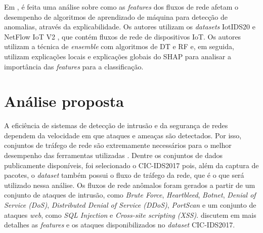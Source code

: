 \documentclass[12pt]{article}
\begin{document}
Em \cite{le2022classification}, é feita uma análise sobre como as \emph{features} dos fluxos de rede afetam o desempenho de algoritmos de aprendizado de máquina para detecção de anomalias, através da explicabilidade. Os autores utilizam os \emph{datasets} IotIDS20 \cite{ullah2020scheme} e NetFlow IoT V2 \cite{sarhan2022towards}, que contém fluxos de rede de dispositivos IoT. Os autores utilizam a técnica de \emph{ensemble} com algoritmos de DT e RF e, em seguida, utilizam explicações locais e explicações globais do SHAP para analisar a importância das \emph{features} para a classificação.


\section{Análise proposta}
\label{cap:analise}

A eficiência de sistemas de detecção de intrusão e da segurança de redes dependem da velocidade em que ataques e ameaças são detectados. Por isso, conjuntos de tráfego de rede são extremamente necessários para o melhor desempenho das ferramentas utilizadas \cite{dijkhuizen2018survey}. Dentre os conjuntos de dados publicamente disponíveis, foi selecionado o CIC-IDS2017 \cite{sharafaldin2018toward} pois, além da captura de pacotes, o \emph{dataset} também possui o fluxo de tráfego da rede, que é o que será utilizado nessa análise. Os fluxos de rede anômalos foram gerados a partir de um conjunto de ataques de intrusão, como \emph{Brute Force}, \emph{Heartbleed}, \emph{Botnet}, \emph{Denial of Service (DoS)}, \emph{Distributed Denial of Service (DDoS)}, \emph{PortScan} e um conjunto de ataques \emph{web}, como \emph{SQL Injection} e \emph{Cross-site scripting (XSS)}. \cite{rosay2022multi} discutem em mais detalhes as \textit{features} e os ataques disponibilizados no \emph{dataset} CIC-IDS2017.
\end{document}
